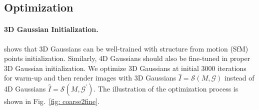 
    
\subsection{Optimization}
\label{subsec:optimization}



\paragraph{3D Gaussian Initialization.}
\cite{3dgs} shows that 3D Gaussians can be well-trained with structure from motion (SfM)~\cite{schonberger2016structure} points initialization. Similarly, 4D Gaussians should also be fine-tuned in proper 3D Gaussian initialization. We optimize 3D Gaussians at initial 3000 iterations for warm-up and then render images with 3D Gaussians $\hat{I} = \mathcal{S}(M,\mathcal{G})$ instead of 4D Gaussians $\hat{I}=\mathcal{S}(M,\mathcal{G}^\prime)$. The illustration of the optimization process is shown in Fig.~\ref{fig: coarse2fine}.







